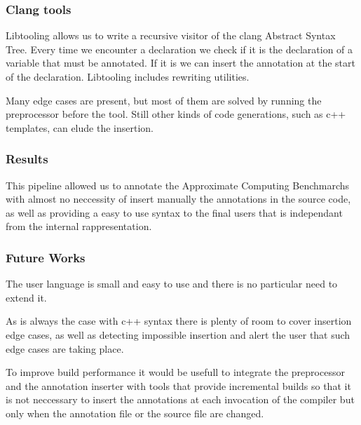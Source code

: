 \documentclass{beamer}
\begin{document}
\begin{frame}[fragile]
	\frametitle{Clang tools}
	\begin{block}{}
		Libtooling allows us to write a recursive visitor of the clang Abstract Syntax Tree. Every time we encounter a declaration we check if it is the declaration of a variable that must be annotated. If it is we can insert the annotation at the start of the declaration. Libtooling includes rewriting utilities. 
	\end{block}

	\begin{block}{}
		Many edge cases are present, but most of them are solved by running the preprocessor before the tool. Still other kinds of code generations, such as c++ templates, can elude the insertion.
	\end{block}
	

\end{frame}
\begin{frame}[fragile]
	\frametitle{Results}
	\begin{block}{}
		This pipeline allowed us to annotate the Approximate Computing Benchmarchs with almost no neccessity of insert manually the annotations in the source code, as well as providing a easy to use syntax to the final users that is independant from the internal rappresentation.
	\end{block}


\end{frame}
\begin{frame}[fragile]
	\frametitle{Future Works}
	\begin{block}{}
		The user language is small and easy to use and there is no particular need to extend it.
	\end{block}
	\begin{block}{}
		As is always the case with c++ syntax there is plenty of room to cover insertion edge cases, as well as detecting impossible insertion and alert the user that such edge cases are taking place.
	\end{block}
	\begin{block}{}
		To improve build performance it would be usefull to integrate the preprocessor and the annotation inserter with tools that provide incremental builds so that it is not neccessary to insert the annotations at each invocation of the compiler but only when the annotation file or the source file are changed.
	\end{block}


\end{frame}
\end{document}
